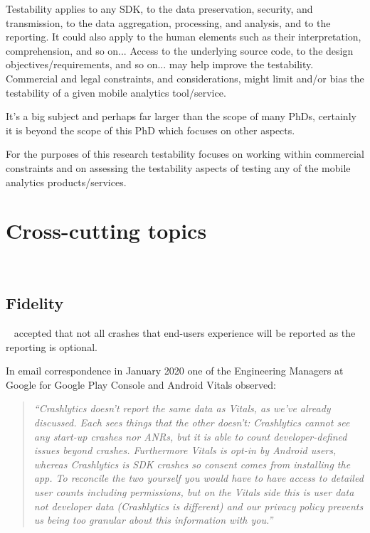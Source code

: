 Testability applies to any SDK, to the data preservation, security, and transmission, to the data aggregation, processing, and analysis, and to the reporting. It could also apply to the human elements such as their interpretation, comprehension, and so on... Access to the underlying source code, to the design objectives/requirements, and so on... may help improve the testability. Commercial and legal constraints, and considerations, might limit and/or bias the testability of a given mobile analytics tool/service.

It's a big subject and perhaps far larger than the scope of many PhDs, certainly it is beyond the scope of this PhD which focuses on other aspects. 

For the purposes of this research testability focuses on working within commercial constraints and on assessing the testability aspects of testing any of the mobile analytics products/services.

\section{Cross-cutting topics}~\label{tata-cross-cutting-concerns}

\subsection{Fidelity}~\label{tata-fidelity-topic}
 accepted that not all crashes that end-users experience will be reported as the reporting is optional. 

In email correspondence in January 2020 one of the Engineering Managers at Google for Google Play Console and Android Vitals observed:

\begin{quote}
    \emph{``Crashlytics doesn't report the same data as Vitals, as we've already discussed. Each sees things that the other doesn't: Crashlytics cannot see any start-up crashes nor ANRs, but it is able to count developer-defined issues beyond crashes. Furthermore Vitals is opt-in by Android users, whereas Crashlytics is SDK crashes so consent comes from installing the app. To reconcile the two yourself you would have to have access to detailed user counts including permissions, but on the Vitals side this is user data not developer data (Crashlytics is different) and our privacy policy prevents us being too granular about this information with you.''}
\end{quote}

